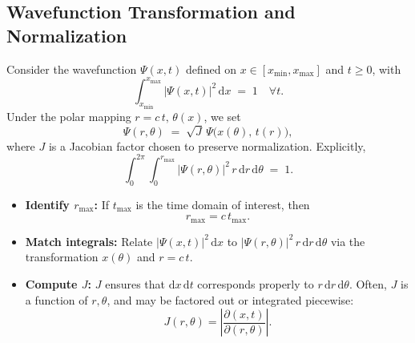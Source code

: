 \documentclass{article}
\begin{document}
\subsection{Wavefunction Transformation and Normalization}
\label{app:sec:wavefunction-norm}
Consider the wavefunction $\Psi(x,t)$ defined on $x\in[x_{\min},x_{\max}]$ 
and $t\ge0$, with
\[
  \int_{x_{\min}}^{x_{\max}} |\Psi(x,t)|^2 \,\mathrm{d}x \;=\; 1 \quad \forall t.
\]
Under the polar mapping $r=c\,t,\, \theta(x)$, we set
\[
  \Psi(r,\theta) \;=\; \sqrt{J}\,\Psi\bigl(x(\theta),\,t(r)\bigr),
\]
where $J$ is a Jacobian factor chosen to preserve normalization. Explicitly,
\[
  \int_0^{2\pi} \int_0^{r_{\max}} |\Psi(r,\theta)|^2 
  \,r\,\mathrm{d}r\,\mathrm{d}\theta \;=\; 1.
\]
\begin{itemize}
  \item \textbf{Identify \( r_{\max} \):}  
  If \( t_{\max} \) is the time domain of interest, then  
  \[
    r_{\max} = c \, t_{\max}.
  \]

  \item \textbf{Match integrals:}  
  Relate \( |\Psi(x,t)|^2 \, \mathrm{d}x \) to \( |\Psi(r,\theta)|^2 \, r \, \mathrm{d}r \, \mathrm{d}\theta \)  
  via the transformation \( x(\theta) \) and \( r = c \, t \).
  
  \item \textbf{Compute \( J \):}  
  \( J \) ensures that \( \mathrm{d}x \, \mathrm{d}t \) corresponds properly to  
  \( r \, \mathrm{d}r \, \mathrm{d}\theta \).  
  Often, \( J \) is a function of \( r, \theta \), and may be factored out or integrated piecewise:
  \[
    J(r, \theta) = \left| \frac{\partial(x, t)}{\partial(r, \theta)} \right|.
  \]
\end{itemize}
\end{document}
